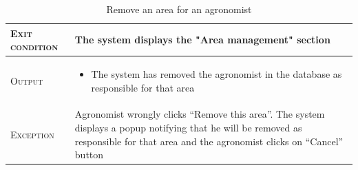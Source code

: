 \begin{table}[H]
\begin{tabular}[c]{|l|p{}|}
        \hline %
        \textsc{Exit condition}    &  The system displays the "Area management" section\\
    	\hline %
    	\textsc{Output}             &  \begin{itemize}
    	    \item The system has removed the agronomist in the database as responsible for that area
    	\end{itemize}\\
    	\hline %
    	\textsc{Exception}         &  Agronomist wrongly clicks “Remove this area”. The system displays a popup notifying that he will be removed as responsible for that area and the agronomist clicks on “Cancel” button\\
    	\hline %
        
    \end{tabular}
    \caption{\label{tab:responsible_area_insertion}Remove an area for an agronomist}
\end{table}

